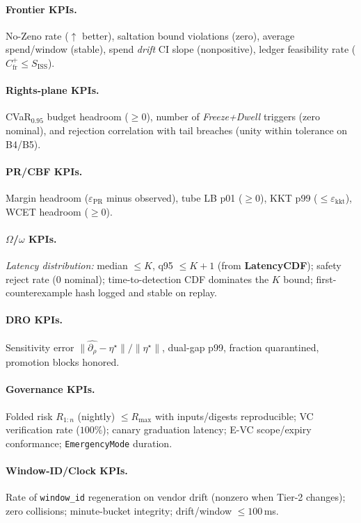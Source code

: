 \documentclass[10pt]{article}
\providecommand{\constsymPRmargin}{\varepsilon_{\mathrm{PR}}}
\newcommand{\epsPR}{\constsymPRmargin}
\newcommand{\SISS}{S_{\mathrm{ISS}}}
\begin{document}
\paragraph{Frontier KPIs.}
No-Zeno rate ($\uparrow$ better), saltation bound violations (zero), average spend/window (stable), spend \emph{drift} CI slope (nonpositive), ledger feasibility rate ($C_{\mathrm{fr}}^{+}\le\SISS$).

\paragraph{Rights-plane KPIs.}
CVaR$_{0.95}$ budget headroom ($\ge 0$), number of \emph{Freeze+Dwell} triggers (zero nominal),
and rejection correlation with tail breaches (unity within tolerance on B4/B5).

\paragraph{PR/CBF KPIs.}
Margin headroom ($\epsPR$ minus observed), tube LB p01 ($\ge 0$), KKT p99 ($\le \varepsilon_{\mathrm{kkt}}$), WCET headroom ($\ge 0$).

\paragraph{$\Omega$/$\omega$ KPIs.}
\emph{Latency distribution:} median $\le K$, q95 $\le K{+}1$ (from \textbf{LatencyCDF}); safety reject rate ($0$ nominal);
time-to-detection CDF dominates the $K$ bound; first-counterexample hash logged and stable on replay.

\paragraph{DRO KPIs.}
Sensitivity error $\|\widehat{\partial_\rho}-\eta^\star\|/\|\eta^\star\|$, dual-gap p99, fraction quarantined, promotion blocks honored.

\paragraph{Governance KPIs.}
Folded risk $R_{1:n}$ (nightly) $\le R_{\max}$ with inputs/digests reproducible; VC verification rate ($100\%$); canary graduation latency; E-VC scope/expiry conformance; \texttt{EmergencyMode} duration.

\paragraph{Window-ID/Clock KPIs.}
Rate of \texttt{window\_id} regeneration on vendor drift (nonzero when Tier-2 changes); zero collisions; minute-bucket integrity; drift/window $\le 100$\,ms.
\end{document}
